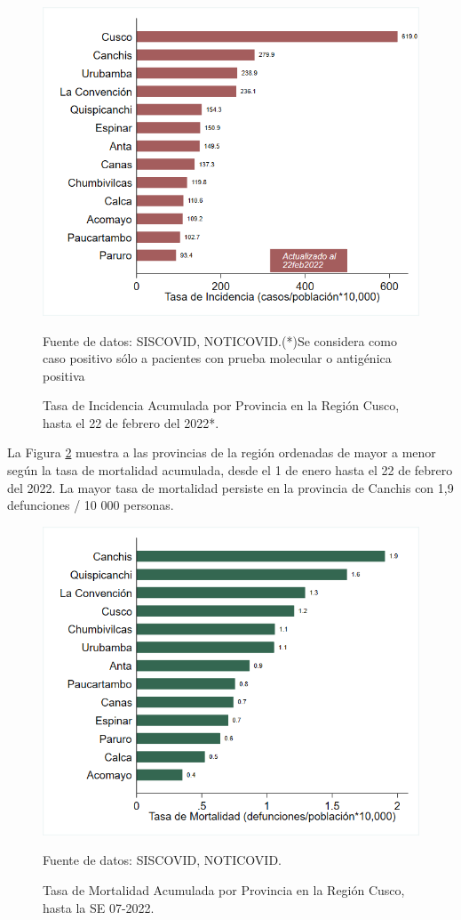 \documentclass[12pt,a4paper,openany]{book}
\begin{document}
\begin{figure}[!htpb]
	\caption{Tasa de Incidencia Acumulada por Provincia en la Región Cusco, hasta el 22 de febrero del 2022*. }\label{fig:incidencia_provincias}
	\begin{center}
		\includegraphics[width=0.60\linewidth]{../figuras/incidencia_provincial_2022.png}
	\end{center}
	{\footnotesize {
	Fuente de datos: SISCOVID, NOTICOVID.(*)Se considera como caso positivo sólo a pacientes con prueba molecular o antigénica positiva}}
\end{figure}

La Figura \ref{fig:mortalidad_ordenada} muestra a las provincias de la región ordenadas de mayor a menor según la tasa de mortalidad acumulada, desde el 1 de enero hasta el 22 de febrero del 2022. La mayor tasa de mortalidad persiste en la provincia de Canchis con 1,9 defunciones / 10 000 personas.   

\begin{figure}[h]
	\caption{Tasa de Mortalidad Acumulada por Provincia en la Región Cusco, hasta la SE 07-2022. }\label{fig:mortalidad_ordenada}
	\begin{center}
		\includegraphics[width=0.60\linewidth]{../figuras/mortalidad_provincial_2022.png}
	\end{center}
	{\footnotesize {Fuente de datos: SISCOVID, NOTICOVID.}}
\end{figure}
\end{document}
